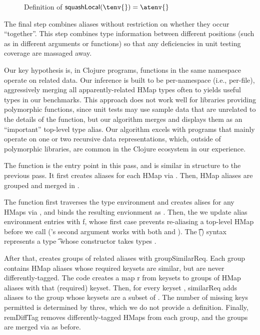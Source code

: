 \begin{figure*}
\begin{mathpar}
\end{mathpar}
\caption{Definition of $\squashlocal{}(\tenv{}) = \atenv{}$
  }
  \label{infer:fig:squashlocal}
\end{figure*}


The final step combines aliases
without restriction on whether they occur ``together''.
This step combines type information between different positions
(such as in different arguments or functions) so that any deficiencies
in unit testing coverage are massaged away.

Our key hypothesis is, in Clojure programs, functions in the same
namespace operate on related data. Our inference is built
to be per-namespace (i.e., per-file), aggressively merging
all apparently-related HMap types often to yields useful types
in our benchmarks.
This approach does not work well for libraries providing polymorphic
functions, since unit tests may use sample data that are unrelated
to the details of the function, but our algorithm merges and displays
them as an ``important'' top-level type alias.
Our algorithm excels
with programs that mainly operate on one or two recursive data representations,
which, outside of polymorphic libraries, are common in the Clojure ecosystem
in our experience.

The \squashglobal{} function is the entry point in this pass,
and is similar in structure to the previous pass.
It first creates aliases for each HMap via \aliassinglehmap{}.
Then, HMap aliases are grouped and merged in \squashhorizonally{}.

The \aliassinglehmap{} function first traverses the type environment
and creates alises for any HMaps via \singlehmap{}, and binds the resulting
envionment as \atenvp{}.
Then, the we update alias environment entries with \textsf{f}, whose first
case prevents re-aliasing a top-level HMap before we call \singlehmap{}
(\singlehmap{}'s second argument works with both \x{} and \alias{}).
The \t{}(\ova{\s{}}) syntax represents a type \t{} whose constructor
takes types \ova{\s{}}.

After that, \squashhorizonally{} creates groups of related
aliases with \textsf{groupSimilarReq}.
Each group contains HMap aliases whose required keysets are similar,
but are never differently-tagged.
The code creates a map \textsf{r} from keysets to groups of HMap
aliases with that (required) keyset.
Then, for every keyset \ova{\kw{}}, \textsf{similarReq} adds aliases to the group
whose keysets are a subset of \ova{\kw{}}. The number of missing
keys permitted is determined by \textsf{thres}, which we do not provide a
definition.
Finally, \textsf{remDiffTag} removes differently-tagged HMaps from each group,
and the groups are merged via \mergealiases{} as before.

